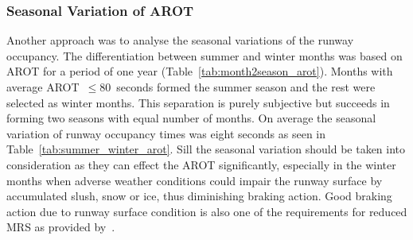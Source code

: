 \subsubsection{Seasonal Variation of AROT\label{sssec:seasonal_arot}}
Another approach was to analyse the seasonal variations of the runway occupancy. The differentiation between summer and winter months was based on AROT for a period of one year (Table~\ref{tab:month2season_arot}). Months with average AROT~$\leq$80~seconds formed the summer season and the rest were selected as winter months. This separation is purely subjective but succeeds in forming two seasons with equal number of months. On average the seasonal variation of runway occupancy times was eight seconds as seen in Table~\ref{tab:summer_winter_arot}. Sill the seasonal variation should be taken into consideration as they can effect the AROT significantly, especially in the winter months when adverse weather conditions could impair the runway surface by accumulated slush, snow or ice, thus diminishing braking action. Good braking action due to runway surface condition is also one of the requirements for reduced MRS as provided by~\cite{doc44444}.
\begin{table}[h]
\centering
{}
\caption[AROTs for the air traffic mix by season]{AROT statistics for the air traffic mix at KEF by season. The count is the number of landings in peak hours since October 2017}
\label{tab:summer_winter_arot}
\end{table}

